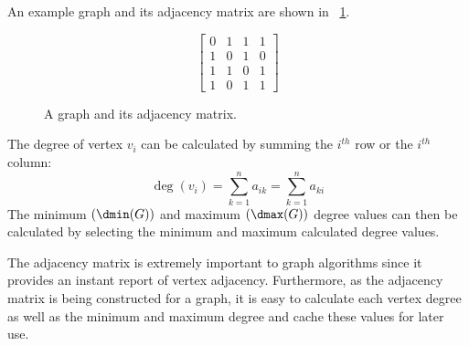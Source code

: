 An example graph and its adjacency matrix are shown in \figurename~\ref{fig:adjacency}.

\begin{figure}[H]
  \begin{minipage}{2.5in}
    \centering
  \end{minipage}
  \begin{minipage}{2.5in}
    \centering
    \[\begin{bmatrix}
      0 & 1 & 1 & 1 \\
      1 & 0 & 1 & 0 \\
      1 & 1 & 0 & 1 \\
      1 & 0 & 1 & 1
    \end{bmatrix}\]
  \end{minipage}
  \caption{A graph and its adjacency matrix.}
  \label{fig:adjacency}
\end{figure}

The degree of vertex \(v_i\) can be calculated by summing the \(i^{th}\) row or the \(i^{th}\) column:
\[\deg(v_i)=\sum_{k=1}^na_{ik}=\sum_{k=1}^na_{ki}\]
The minimum \((\dmin(G))\) and maximum \((\dmax(G))\) degree values can then be calculated by selecting the minimum
and maximum calculated degree values.

The adjacency matrix is extremely important to graph algorithms since it provides an instant report of vertex
adjacency.  Furthermore, as the adjacency matrix is being constructed for a graph, it is easy to calculate each
vertex degree as well as the minimum and maximum degree and cache these values for later use.
